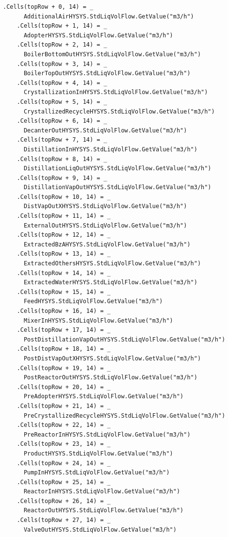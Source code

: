 \documentclass[a4j]{jsreport}
\begin{document}
\begin{lstlisting}[caption=HYSYSとpythonを繋ぐコード]
    .Cells(topRow + 0, 14) = _
      AdditionalAirHYSYS.StdLiqVolFlow.GetValue("m3/h")
    .Cells(topRow + 1, 14) = _
      AdopterHYSYS.StdLiqVolFlow.GetValue("m3/h")
    .Cells(topRow + 2, 14) = _
      BoilerBottomOutHYSYS.StdLiqVolFlow.GetValue("m3/h")
    .Cells(topRow + 3, 14) = _
      BoilerTopOutHYSYS.StdLiqVolFlow.GetValue("m3/h")
    .Cells(topRow + 4, 14) = _
      CrystallizationInHYSYS.StdLiqVolFlow.GetValue("m3/h")
    .Cells(topRow + 5, 14) = _
      CrystallizedRecycleHYSYS.StdLiqVolFlow.GetValue("m3/h")
    .Cells(topRow + 6, 14) = _
      DecanterOutHYSYS.StdLiqVolFlow.GetValue("m3/h")
    .Cells(topRow + 7, 14) = _
      DistillationInHYSYS.StdLiqVolFlow.GetValue("m3/h")
    .Cells(topRow + 8, 14) = _
      DistillationLiqOutHYSYS.StdLiqVolFlow.GetValue("m3/h")
    .Cells(topRow + 9, 14) = _
      DistillationVapOutHYSYS.StdLiqVolFlow.GetValue("m3/h")
    .Cells(topRow + 10, 14) = _
      DistVapOutXHYSYS.StdLiqVolFlow.GetValue("m3/h")
    .Cells(topRow + 11, 14) = _
      ExternalOutHYSYS.StdLiqVolFlow.GetValue("m3/h")
    .Cells(topRow + 12, 14) = _
      ExtractedBzAHYSYS.StdLiqVolFlow.GetValue("m3/h")
    .Cells(topRow + 13, 14) = _
      ExtractedOthersHYSYS.StdLiqVolFlow.GetValue("m3/h")
    .Cells(topRow + 14, 14) = _
      ExtractedWaterHYSYS.StdLiqVolFlow.GetValue("m3/h")
    .Cells(topRow + 15, 14) = _
      FeedHYSYS.StdLiqVolFlow.GetValue("m3/h")
    .Cells(topRow + 16, 14) = _
      MixerInHYSYS.StdLiqVolFlow.GetValue("m3/h")
    .Cells(topRow + 17, 14) = _
      PostDistillationVapOutHYSYS.StdLiqVolFlow.GetValue("m3/h")
    .Cells(topRow + 18, 14) = _
      PostDistVapOutXHYSYS.StdLiqVolFlow.GetValue("m3/h")
    .Cells(topRow + 19, 14) = _
      PostReactorOutHYSYS.StdLiqVolFlow.GetValue("m3/h")
    .Cells(topRow + 20, 14) = _
      PreAdopterHYSYS.StdLiqVolFlow.GetValue("m3/h")
    .Cells(topRow + 21, 14) = _
      PreCrystallizedRecycleHYSYS.StdLiqVolFlow.GetValue("m3/h")
    .Cells(topRow + 22, 14) = _
      PreReactorInHYSYS.StdLiqVolFlow.GetValue("m3/h")
    .Cells(topRow + 23, 14) = _
      ProductHYSYS.StdLiqVolFlow.GetValue("m3/h")
    .Cells(topRow + 24, 14) = _
      PumpInHYSYS.StdLiqVolFlow.GetValue("m3/h")
    .Cells(topRow + 25, 14) = _
      ReactorInHYSYS.StdLiqVolFlow.GetValue("m3/h")
    .Cells(topRow + 26, 14) = _
      ReactorOutHYSYS.StdLiqVolFlow.GetValue("m3/h")
    .Cells(topRow + 27, 14) = _
      ValveOutHYSYS.StdLiqVolFlow.GetValue("m3/h")


\end{lstlisting}
\end{document}
